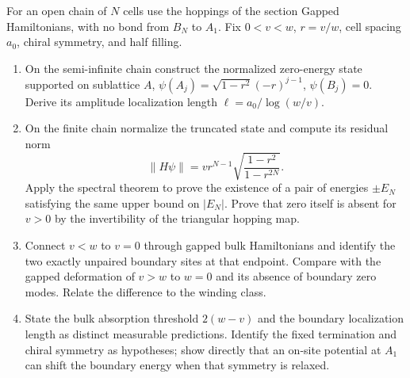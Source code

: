 \begin{exercise}
For an open chain of $N$ cells use the hoppings of the section
Gapped Hamiltonians, with no bond from $B_N$ to $A_1$.
Fix $0<v<w$, $r=v/w$, cell spacing $a_0$, chiral symmetry,
and half filling.
\begin{enumerate}[label=(\alph*)]
\item On the semi-infinite chain construct the normalized
zero-energy state supported on sublattice $A$,
$\psi(A_j)=\sqrt{1-r^2}(-r)^{j-1}$, $\psi(B_j)=0$.
Derive its amplitude localization length
$\ell=a_0/\log(w/v)$.
\item On the finite chain normalize the truncated state and
compute its residual norm
\[
 \|H\psi\|=v r^{N-1}
       \sqrt{\frac{1-r^2}{1-r^{2N}}}.
\]
Apply the spectral theorem to prove the existence of a pair
of energies $\pm E_N$ satisfying the same upper bound on
$|E_N|$. Prove that zero itself is absent for $v>0$ by the
invertibility of the triangular hopping map.
\item Connect $v<w$ to $v=0$ through gapped bulk Hamiltonians
and identify the two exactly unpaired boundary sites at that
endpoint. Compare with the gapped deformation of $v>w$ to
$w=0$ and its absence of boundary zero modes.
Relate the difference to the winding class.
\item State the bulk absorption threshold $2(w-v)$ and the
boundary localization length as distinct measurable predictions.
Identify the fixed termination and chiral symmetry as hypotheses;
show directly that an on-site potential at $A_1$ can shift the
boundary energy when that symmetry is relaxed.
\end{enumerate}
\end{exercise}
